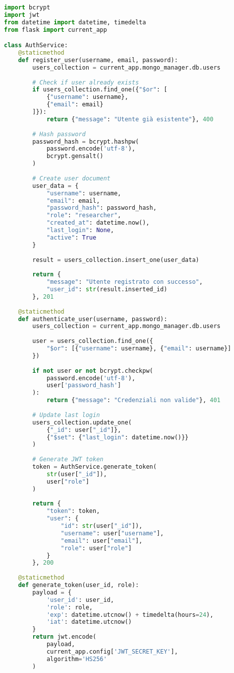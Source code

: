 \documentclass[12pt,a4paper]{report}
\begin{document}
\begin{lstlisting}[language=Python, caption=Authentication Service]
import bcrypt
import jwt
from datetime import datetime, timedelta
from flask import current_app

class AuthService:
    @staticmethod
    def register_user(username, email, password):
        users_collection = current_app.mongo_manager.db.users
        
        # Check if user already exists
        if users_collection.find_one({"$or": [
            {"username": username}, 
            {"email": email}
        ]}):
            return {"message": "Utente già esistente"}, 400
        
        # Hash password
        password_hash = bcrypt.hashpw(
            password.encode('utf-8'), 
            bcrypt.gensalt()
        )
        
        # Create user document
        user_data = {
            "username": username,
            "email": email,
            "password_hash": password_hash,
            "role": "researcher",
            "created_at": datetime.now(),
            "last_login": None,
            "active": True
        }
        
        result = users_collection.insert_one(user_data)
        
        return {
            "message": "Utente registrato con successo",
            "user_id": str(result.inserted_id)
        }, 201
    
    @staticmethod
    def authenticate_user(username, password):
        users_collection = current_app.mongo_manager.db.users
        
        user = users_collection.find_one({
            "$or": [{"username": username}, {"email": username}]
        })
        
        if not user or not bcrypt.checkpw(
            password.encode('utf-8'), 
            user['password_hash']
        ):
            return {"message": "Credenziali non valide"}, 401
        
        # Update last login
        users_collection.update_one(
            {"_id": user["_id"]},
            {"$set": {"last_login": datetime.now()}}
        )
        
        # Generate JWT token
        token = AuthService.generate_token(
            str(user["_id"]), 
            user["role"]
        )
        
        return {
            "token": token,
            "user": {
                "id": str(user["_id"]),
                "username": user["username"],
                "email": user["email"],
                "role": user["role"]
            }
        }, 200
    
    @staticmethod
    def generate_token(user_id, role):
        payload = {
            'user_id': user_id,
            'role': role,
            'exp': datetime.utcnow() + timedelta(hours=24),
            'iat': datetime.utcnow()
        }
        return jwt.encode(
            payload, 
            current_app.config['JWT_SECRET_KEY'], 
            algorithm='HS256'
        )
\end{lstlisting}
\end{document}

